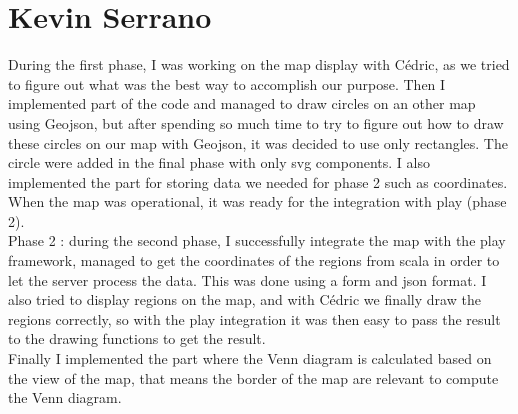 \section{Kevin Serrano}

During the first phase, I was working on the map display with Cédric, as we tried to figure out what was the best way to accomplish our purpose. Then I implemented part of the code and managed to draw circles on an other map using Geojson, but after spending so much time to try to figure out how to draw these circles on our map with Geojson, it was decided to use only rectangles. The circle were added in the final phase with only svg components. I also implemented the part for storing data we needed for phase 2 such as coordinates. When the map was operational, it was ready for the integration with play (phase 2).\\
Phase 2 : during the second phase, I successfully integrate the map with the play framework, managed to get the coordinates of the regions from scala in order to let the server process the data. This was done using a form and json format. I also tried to display regions on the map, and with Cédric we finally draw the regions correctly, so with the play integration it was then easy to pass the result to the drawing functions to get the result.\\
Finally I implemented the part where the Venn diagram is calculated based on the view of the map, that means the border of the map are relevant to compute the Venn diagram.



